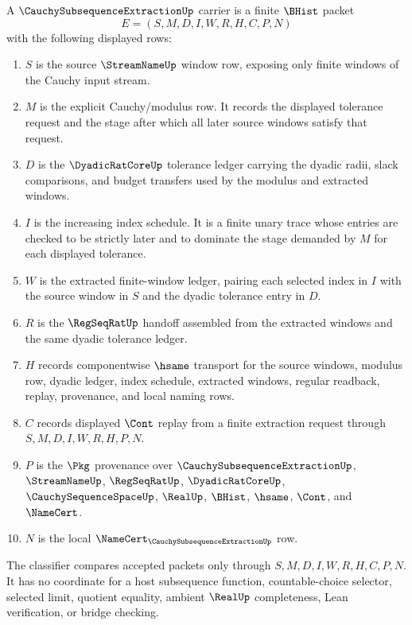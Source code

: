 \begin{definition}
\label{def:cauchy-subsequence-extraction-carrier}
A $\CauchySubsequenceExtractionUp$ carrier is a finite $\BHist$ packet
$$
E=(S,M,D,I,W,R,H,C,P,N)
$$
with the following displayed rows:
\begin{enumerate}
\item $S$ is the source $\StreamNameUp$ window row, exposing only finite windows of the Cauchy input stream.
\item $M$ is the explicit Cauchy/modulus row. It records the displayed tolerance request and the stage after which all later source windows satisfy that request.
\item $D$ is the $\DyadicRatCoreUp$ tolerance ledger carrying the dyadic radii, slack comparisons, and budget transfers used by the modulus and extracted windows.
\item $I$ is the increasing index schedule. It is a finite unary trace whose entries are checked to be strictly later and to dominate the stage demanded by $M$ for each displayed tolerance.
\item $W$ is the extracted finite-window ledger, pairing each selected index in $I$ with the source window in $S$ and the dyadic tolerance entry in $D$.
\item $R$ is the $\RegSeqRatUp$ handoff assembled from the extracted windows and the same dyadic tolerance ledger.
\item $H$ records componentwise $\hsame$ transport for the source windows, modulus row, dyadic ledger, index schedule, extracted windows, regular readback, replay, provenance, and local naming rows.
\item $C$ records displayed $\Cont$ replay from a finite extraction request through $S,M,D,I,W,R,H,P,N$.
\item $P$ is the $\Pkg$ provenance over $\CauchySubsequenceExtractionUp$, $\StreamNameUp$, $\RegSeqRatUp$, $\DyadicRatCoreUp$, $\CauchySequenceSpaceUp$, $\RealUp$, $\BHist$, $\hsame$, $\Cont$, and $\NameCert$.
\item $N$ is the local $\NameCert_{\CauchySubsequenceExtractionUp}$ row.
\end{enumerate}
The classifier compares accepted packets only through $S,M,D,I,W,R,H,C,P,N$. It has no coordinate for a host subsequence function, countable-choice selector, selected limit, quotient equality, ambient $\RealUp$ completeness, Lean verification, or bridge checking.
\end{definition}

